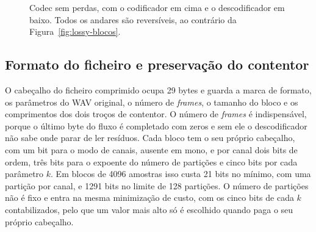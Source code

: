 \documentclass[a4paper,11pt]{article}
\begin{document}
\begin{figure}[htbp]
\caption{Codec sem perdas, com o codificador em cima e o descodificador em
baixo. Todos os andares são reversíveis, ao contrário da
Figura~\ref{fig:lossy-blocos}.}
\label{fig:lossless-blocos}
\end{figure}

\subsection{Formato do ficheiro e preservação do contentor}
\label{sec:formato}
O cabeçalho do ficheiro comprimido ocupa \num{29} bytes e guarda a marca de
formato, os parâmetros do WAV original, o número de \emph{frames}, o tamanho do
bloco e os comprimentos dos dois troços de contentor. O número de \emph{frames}
é indispensável, porque o último byte do fluxo é completado com zeros e sem ele
o descodificador não sabe onde parar de ler resíduos. Cada bloco tem o seu
próprio cabeçalho, com um bit para o modo de canais, ausente em mono, e por
canal dois bits de ordem, três bits para o expoente do número de partições e
cinco bits por cada parâmetro $k$. Em blocos de \num{4096} amostras isso custa
\num{21} bits no mínimo, com uma partição por canal, e \num{1291} bits no limite
de \num{128} partições. O número de partições não é fixo e entra na mesma
minimização de custo, com os cinco bits de cada $k$ contabilizados, pelo que um
valor mais alto só é escolhido quando paga o seu próprio cabeçalho.
\end{document}
